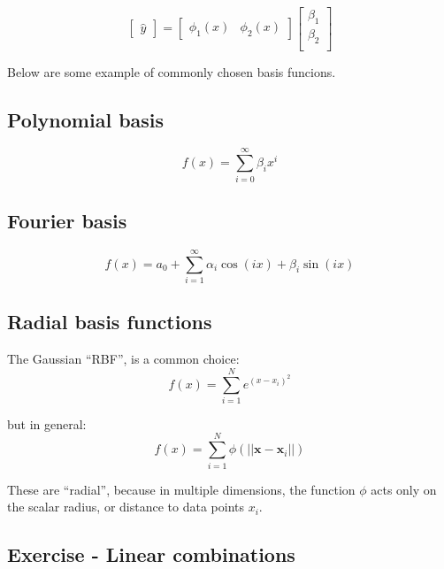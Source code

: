 \documentclass[11pt]{article}
\newcommand\xvec{\boldsymbol{x}}
\newcommand\yhat{\hat{y}}
\begin{document}
\begin{equation}
    \begin{bmatrix}
        \yhat 
    \end{bmatrix} = 
    \begin{bmatrix}
        \phi_1(x) & \phi_2(x) 
    \end{bmatrix}
    \begin{bmatrix}
        \beta_1 \\
        \beta_2 \\
    \end{bmatrix}
\end{equation}

Below are some example of commonly chosen basis funcions.

\subsection{ Polynomial basis }

\begin{equation}
    f(x) = \sum_{i=0}^{\infty} \beta_i x^i
\end{equation}

\subsection{ Fourier basis }

\begin{equation}
    f(x) = a_0 + \sum_{i=1}^{\infty} \alpha_i \cos( ix ) + \beta_i \sin( ix)
\end{equation}

\subsection{ Radial basis functions }


The Gaussian ``RBF'', is a common choice:
\begin{equation}
  f(x) = \sum_{i=1}^{N} e^{(x - x_i)^2}
\end{equation}

but in general:
\begin{equation}
  f(x) = \sum_{i=1}^{N} \phi( || \xvec - \xvec_i || )
\end{equation}

These are ``radial'', because in multiple dimensions, the function
$\phi$ acts only on the scalar radius, or distance to data points $x_i$.

\subsection{ Exercise - Linear combinations }
\end{document}
